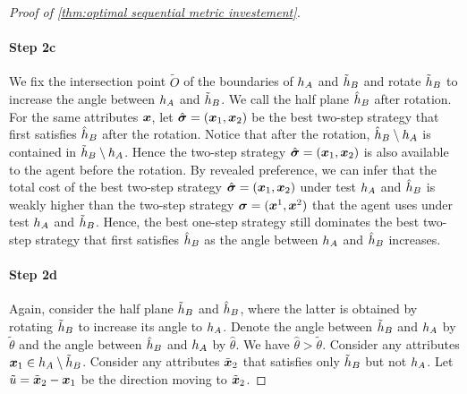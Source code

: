 \begin{proof}[Proof of \cref{thm:optimal sequential metric investement}]
\paragraph{Step 2c}
     We fix the intersection point $\tilde O$ of the boundaries of $h_A$ and $\tilde {h}_B$ and rotate $\tilde {h}_B$ to increase the angle between $h_A$ and $\tilde {h}_B$.
     We call the half plane $\hat {h}_B$ after rotation.
    For the same attributes $\boldsymbol{x}$, let $\hat{\boldsymbol{\sigma}}=(\boldsymbol{x}_1,\boldsymbol{x}_2)$ be the best two-step strategy that first satisfies $\hat {h}_B$ after the rotation.
    Notice that after the rotation, $\hat{h}_B \setminus h_A$ is contained in $\tilde {h}_B \setminus h_A$. 
    Hence the two-step strategy $\hat{\boldsymbol{\sigma}}=(\boldsymbol{x}_1,\boldsymbol{x}_2)$ is also available to the agent before the rotation.
    By revealed preference, we can infer that the total cost of the best two-step strategy $\hat{\boldsymbol{\sigma}}=(\boldsymbol{x}_1,\boldsymbol{x}_2)$ under test $h_A$ and $\hat{h}_B$ is weakly higher than the two-step strategy $\boldsymbol{\sigma}=(\boldsymbol{x}^1,\boldsymbol{x}^2)$ that the agent uses under test $h_A$ and $\tilde{h}_B$.
    Hence, the best one-step strategy still dominates the best two-step strategy that first satisfies $\hat {h}_B$ as the angle between $h_A$ and $\hat {h}_B$ increases.
    
\paragraph{Step 2d}
Again, consider the half plane $\tilde {h}_B$  and $\hat {h}_B$, where the latter is obtained by  rotating $\tilde{h}_B$ to increase its angle to $h_A$.
Denote the angle between $\tilde{h}_B$ and $h_A$ by $\tilde \theta$ and the angle between $\hat{h}_B$ and $h_A$ by $\hat \theta$.
We have $\hat\theta >\tilde \theta$.
    Consider any attributes $ \boldsymbol{x}_1 \in h_A \setminus \tilde {h}_B$. 
    Consider any attributes $\tilde {\boldsymbol{x}}_2$ that satisfies only $\tilde {h}_B$ but not $h_A$. Let $\tilde u = \tilde{\boldsymbol{x}}_2 - \boldsymbol{x}_1$ be the direction moving to $\tilde{\boldsymbol{x}}_2$.


\end{proof}
